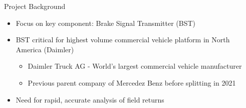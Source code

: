 \documentclass[8pt,compress]{beamer}
\begin{document}
\begin{frame}
\begin{block}{Project Background}
\begin{itemize}
        \item Focus on key component: Brake Signal Transmitter (BST)
        \item BST critical for highest volume commercial vehicle platform in North America (Daimler)
        \begin{itemize}
            \item Daimler Truck AG - World's largest commercial vehicle manufacturer
            \item Previous parent company of Mercedez Benz before splitting in 2021
        \end{itemize}
        \item Need for rapid, accurate analysis of field returns
    \end{itemize}
  \end{block}
\end{frame}
\end{document}
